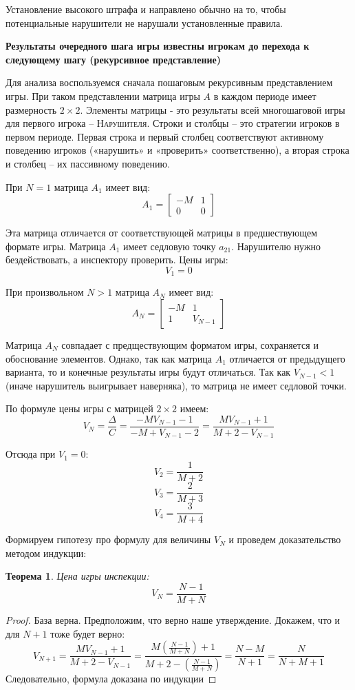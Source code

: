 \documentclass[aps,%
12pt,%
final,%
oneside,
onecolumn,%
musixtex, %
superscriptaddress,%
centertags]{article} %
\theoremstyle{plain}
\newtheorem{theorem}{Теорема}[section] %
\theoremstyle{definition}
\theoremstyle{remark}
\begin{document}
Установление высокого штрафа и направлено обычно на то, чтобы потенциальные нарушители не нарушали установленные правила.

\textbf{Результаты очередного шага игры известны игрокам до перехода к следующему шагу (рекурсивное представление)}

Для анализа воспользуемся сначала пошаговым рекурсивным
представлением игры. При таком представлении матрица игры $A$ в каждом периоде
имеет размерность $2\times 2$. Элементы матрицы - это результаты всей многошаговой
игры для первого игрока – \textsc{Нарушителя}. Строки и столбцы – это стратегии игроков
в первом периоде. Первая строка и первый столбец соответствуют активному
поведению игроков («нарушить» и «проверить» соответственно), а вторая строка и
столбец – их пассивному поведению.

При $N=1$ матрица $A_1$ имеет вид:
$$A_1 = \begin{bmatrix}
  -M & 1 \\ 0 & 0
\end{bmatrix}$$

Эта матрица отличается от соответствующей матрицы в предшествующем формате игры. Матрица $A_1$ имеет седловую точку $a_{21}$. Нарушителю нужно бездействовать, а инспектору проверить. Цены игры:
$$V_1 = 0$$

При произвольном $N>1$ матрица $A_N$ имеет вид:
$$A_N = \begin{bmatrix}
  -M & 1 \\ 1 & V_{N-1}
\end{bmatrix}$$

Матрица $A_N$ совпадает с предществующим форматом игры, сохраняется и обоснование элементов. Однако, так как матрица $A_1$ отличается от предыдущего варианта, то и конечные результаты игры будут отличаться. Так как $V_{N-1} <1$ (иначе нарушитель выигрывает наверняка), то матрица не имеет седловой точки.

По формуле цены игры с матрицей $2\times 2$ имеем:
$$V_N = \frac{\Delta}{C} = \frac{-MV_{N-1}-1}{-M+V_{N-1}-2} = \frac{MV_{N-1}+1}{M+2-V_{N-1}}$$

Отсюда при $V_1 = 0$:
$$V_2 = \frac{1}{M+2}$$
$$V_3 = \frac{2}{M+3}$$
$$V_4 = \frac{3}{M+4}$$

Формируем гипотезу про формулу для величины $V_N$ и проведем доказательство методом индукции:

\begin{theorem}
  Цена игры инспекции:
  $$V_N = \frac{N-1}{M+N}$$
\end{theorem}
\begin{proof}
  База верна. Предположим, что верно наше утверждение. Докажем, что и для $N+1$ тоже будет верно:
  $$V_{N+1} = \frac{MV_{N-1}+1}{M+2-V_{N-1}} = \frac{M\left(\frac{N-1}{M+N}\right)+1}{M+2-\left(\frac{N-1}{M+N}\right)} = \frac{N-M}{N+1} = \frac{N}{N+M+1}$$
  Следовательно, формула доказана по индукции
\end{proof}
\end{document}
